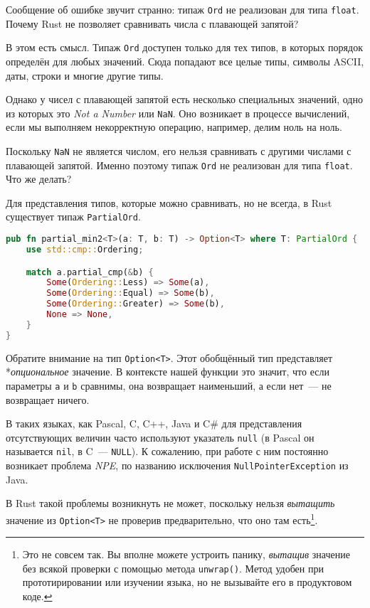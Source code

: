 Сообщение об ошибке звучит странно: типаж \texttt{Ord} не реализован для типа \texttt{float}. Почему Rust не позволяет сравнивать числа с плавающей запятой?

В этом есть смысл. Типаж \texttt{Ord} доступен только для тех типов, в которых порядок определён для любых значений. Сюда попадают все целые типы, символы ASCII, даты, строки и многие другие типы.

Однако у чисел с плавающей запятой есть несколько специальных значений, одно из которых это \textit{Not a Number} или \texttt{NaN}. Оно возникает в процессе вычислений, если мы выполняем некорректную операцию, например, делим ноль на ноль.

Поскольку \texttt{NaN} не является числом, его нельзя сравнивать с другими числами с плавающей запятой.
Именно поэтому типаж \texttt{Ord} не реализован для типа \texttt{float}.
Что же делать?

Для представления типов, которые можно сравнивать, но не всегда, в Rust существует типаж \texttt{PartialOrd}.

\begin{lstlisting}[language=Rust]
    pub fn partial_min2<T>(a: T, b: T) -> Option<T> where T: PartialOrd {
    use std::cmp::Ordering;

    match a.partial_cmp(&b) {
        Some(Ordering::Less) => Some(a),
        Some(Ordering::Equal) => Some(b),
        Some(Ordering::Greater) => Some(b),
        None => None,
    }
}
\end{lstlisting}

Обратите внимание на тип \texttt{Option<T>}.
Этот обобщённый тип представляет *\textit{опциональное} значение.
В контексте нашей функции это значит, что если параметры \texttt{a} и \texttt{b} сравнимы, она возвращает наименьший, а если нет~--- не возвращает ничего.

В таких языках, как Pascal, C, C++, Java и C\# для представления отсутствующих величин часто используют указатель \texttt{null} (в Pascal он называется \texttt{nil}, в C~--- \texttt{NULL}).
К сожалению, при работе с ним постоянно возникает проблема \textit{NPE}, по названию исключения \texttt{NullPointerException} из Java.

В Rust такой проблемы возникнуть не может, поскольку нельзя \textit{вытащить} значение из \texttt{Option<T>} не проверив предварительно, что оно там есть\footnote{
    Это не совсем так.
    Вы вполне можете устроить панику, \textit{вытащив} значение без всякой проверки с помощью метода \texttt{unwrap()}.
    Метод удобен при прототирировании или изучении языка, но не вызывайте его в продуктовом коде.}.

